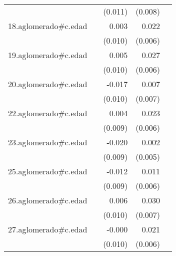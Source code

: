 {\begin{longtable}{l*{4}{D{.}{.}{-1}}}
            &                     &     (0.011)         &     (0.008)         &                     \\
\addlinespace
18.aglomerado#c.edad&                     &       0.003         &       0.022\sym{***}&                     \\
            &                     &     (0.010)         &     (0.006)         &                     \\
\addlinespace
19.aglomerado#c.edad&                     &       0.005         &       0.027\sym{***}&                     \\
            &                     &     (0.010)         &     (0.006)         &                     \\
\addlinespace
20.aglomerado#c.edad&                     &      -0.017         &       0.007         &                     \\
            &                     &     (0.010)         &     (0.007)         &                     \\
\addlinespace
22.aglomerado#c.edad&                     &       0.004         &       0.023\sym{***}&                     \\
            &                     &     (0.009)         &     (0.006)         &                     \\
\addlinespace
23.aglomerado#c.edad&                     &      -0.020\sym{*}  &       0.002         &                     \\
            &                     &     (0.009)         &     (0.005)         &                     \\
\addlinespace
25.aglomerado#c.edad&                     &      -0.012         &       0.011         &                     \\
            &                     &     (0.009)         &     (0.006)         &                     \\
\addlinespace
26.aglomerado#c.edad&                     &       0.006         &       0.030\sym{***}&                     \\
            &                     &     (0.010)         &     (0.007)         &                     \\
\addlinespace
27.aglomerado#c.edad&                     &      -0.000         &       0.021\sym{***}&                     \\
            &                     &     (0.010)         &     (0.006)         &                     \\

\end{longtable}}
